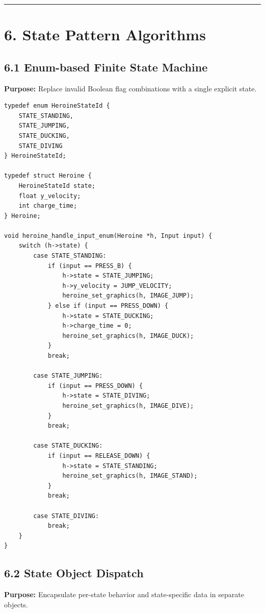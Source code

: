 \documentclass[10pt,letterpaper]{article}
\begin{document}
\medskip\hrule\medskip

\clearpage
\section{6. State Pattern Algorithms}

\subsection{6.1 Enum-based Finite State Machine}

\textbf{Purpose:} Replace invalid Boolean flag combinations with a single explicit state.

\begin{verbatim}
typedef enum HeroineStateId {
    STATE_STANDING,
    STATE_JUMPING,
    STATE_DUCKING,
    STATE_DIVING
} HeroineStateId;

typedef struct Heroine {
    HeroineStateId state;
    float y_velocity;
    int charge_time;
} Heroine;

void heroine_handle_input_enum(Heroine *h, Input input) {
    switch (h->state) {
        case STATE_STANDING:
            if (input == PRESS_B) {
                h->state = STATE_JUMPING;
                h->y_velocity = JUMP_VELOCITY;
                heroine_set_graphics(h, IMAGE_JUMP);
            } else if (input == PRESS_DOWN) {
                h->state = STATE_DUCKING;
                h->charge_time = 0;
                heroine_set_graphics(h, IMAGE_DUCK);
            }
            break;

        case STATE_JUMPING:
            if (input == PRESS_DOWN) {
                h->state = STATE_DIVING;
                heroine_set_graphics(h, IMAGE_DIVE);
            }
            break;

        case STATE_DUCKING:
            if (input == RELEASE_DOWN) {
                h->state = STATE_STANDING;
                heroine_set_graphics(h, IMAGE_STAND);
            }
            break;

        case STATE_DIVING:
            break;
    }
}
\end{verbatim}

\subsection{6.2 State Object Dispatch}

\textbf{Purpose:} Encapsulate per-state behavior and state-specific data in separate objects.
\end{document}
